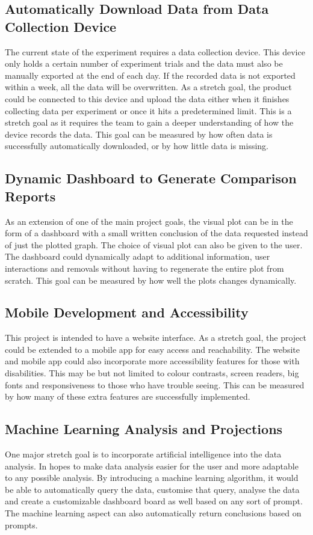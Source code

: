 \documentclass{article}
\begin{document}
\subsection{Automatically Download Data from Data Collection Device}
The current state of the experiment requires a data collection device. This
device only holds a certain number of experiment trials and the data must also
be manually exported at the end of each day. If the recorded data is not
exported within a week, all the data will be overwritten. As a stretch goal, the
product could be connected to this device and upload the data either when it
finishes collecting data per experiment or once it hits a predetermined limit.
This is a stretch goal as it requires the team to gain a deeper understanding of
how the device records the data. This goal can be measured by how often data is
successfully automatically downloaded, or by how little data is missing.

\subsection{Dynamic Dashboard to Generate Comparison Reports}
As an extension of one of the main project goals, the visual plot can be in the
form of a dashboard with a small written conclusion of the data requested
instead of just the plotted graph. The choice of visual plot can also be given
to the user. The dashboard could dynamically adapt to additional information,
user interactions and removals without having to regenerate the entire plot from
scratch. This goal can be measured by how well the plots changes dynamically.

\subsection{Mobile Development and Accessibility}
This project is intended to have a website interface. As a stretch goal, the
project could be extended to a mobile app for easy access and reachability. The
website and mobile app could also incorporate more accessibility features for
those with disabilities. This may be but not limited to colour contrasts, screen
readers, big fonts and responsiveness to those who have trouble seeing. This can
be measured by how many of these extra features are successfully implemented.
 
\subsection{Machine Learning Analysis and Projections}
One major stretch goal is to incorporate artificial intelligence into the data
analysis. In hopes to make data analysis easier for the user and more adaptable
to any possible analysis. By introducing a machine learning algorithm, it would
be able to automatically query the data, customise that query, analyse the data
and create a customizable dashboard board as well based on any sort of prompt.
The machine learning aspect can also automatically return conclusions based on
prompts.
\end{document}
